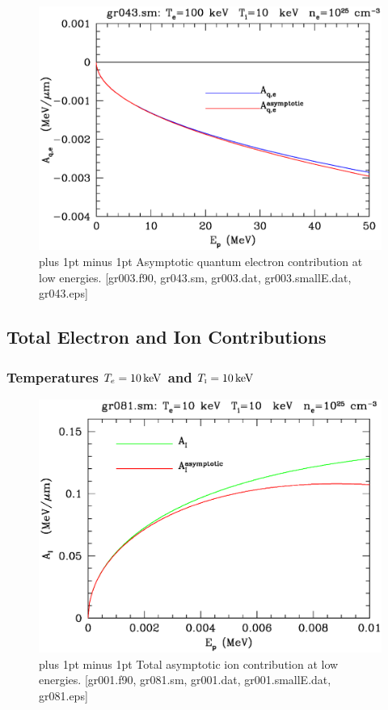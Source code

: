 \documentclass[preprint,12pt,eqsecnum,nofootinbib,amsmath,amssymb]{revtex4}
\newcommand{\smI}{{\rm\scriptscriptstyle I}}
\newcommand{\footnoteskip}{\baselineskip 12pt plus 1pt minus 1pt}
\begin{document}
\vskip-2cm 
\begin{figure}[h!]
\includegraphics[scale=0.45]{gr043.eps} 
\vskip-0.8cm 
\caption{\footnoteskip  
  Asymptotic quantum electron contribution at low
  energies. [gr003.f90, gr043.sm, gr003.dat, gr003.smallE.dat,
  gr043.eps] 
}
\label{fig:gr043}
\end{figure}



\pagebreak
\subsection{Total Electron and Ion Contributions}


\subsubsection{Temperatures $T_e=10\,{\rm keV}$ and $T_\smI=10\,{\rm keV}$}

\vskip-2cm 
\begin{figure}[h!]
\includegraphics[scale=0.45]{gr081.eps} 
\vskip-0.8cm 
\caption{\footnoteskip  
  Total asymptotic ion contribution at low energies. 
 [gr001.f90, gr081.sm, gr001.dat, gr001.smallE.dat, gr081.eps] 
}
\label{fig:gr081}
\end{figure}
\end{document}
